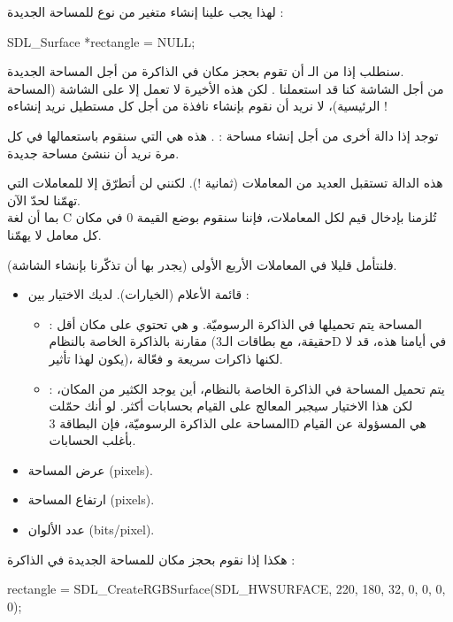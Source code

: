 لهذا يجب علينا إنشاء متغير من نوع
للمساحة الجديدة :

\begin{Csource}
SDL_Surface *rectangle = NULL;
\end{Csource}

سنطلب إذا من الـ
أن تقوم بحجز مكان في الذاكرة من أجل المساحة الجديدة.\\
من أجل الشاشة كنا قد استعملنا
.
لكن هذه الأخيرة لا تعمل إلا على  الشاشة (المساحة الرئيسية)، لا نريد أن نقوم بإنشاء نافذة من أجل كل مستطيل نريد إنشاءه !

توجد إذا دالة أخرى من أجل إنشاء مساحة : 
.
هذه هي التي سنقوم باستعمالها في كل مرة نريد أن ننشئ مساحة جديدة.

هذه الدالة تستقبل العديد من المعاملات (ثمانية !). لكنني لن أتطرّق إلا للمعاملات التي تهمّنا لحدّ الآن.\\
بما أن لغة 
\textenglish{C}
تُلزمنا بإدخال قيم لكل المعاملات، فإننا سنقوم بوضع القيمة 0 في مكان كل معامل لا يهمّنا.

فلنتأمل قليلا في المعاملات الأربع الأولى (يجدر بها أن تذكّرنا بإنشاء الشاشة).

\begin{itemize}
	\item قائمة الأعلام (الخيارات). لديك الاختيار بين :
	\begin{itemize}
		\item {} :
		المساحة يتم تحميلها في الذاكرة الرسوميّة. و هي تحتوي على مكان أقل مقارنة بالذاكرة الخاصة بالنظام (حقيقة، مع بطاقات الـ\textenglish{3D}
		في أيامنا هذه، قد لا يكون لهذا تأثير)، لكنها ذاكرات سريعة و فعّالة.
		\item {} :
		يتم تحميل المساحة في الذاكرة الخاصة بالنظام، أين يوجد الكثير من المكان، لكن هذا الاختيار سيجبر المعالج على القيام بحسابات أكثر. لو أنك حمّلت المساحة على الذاكرة الرسوميّة، فإن البطاقة 
		\textenglish{3D}
		هي المسؤولة عن القيام بأغلب الحسابات.
	\end{itemize}
	\item عرض المساحة (\textenglish{pixels}).
	\item ارتفاع المساحة (\textenglish{pixels}).
	\item عدد الألوان (\textenglish{bits/pixel}).
\end{itemize}

هكذا إذا نقوم بحجز مكان للمساحة الجديدة في الذاكرة :

\begin{Csource}
rectangle = SDL_CreateRGBSurface(SDL_HWSURFACE, 220, 180, 32, 0, 0, 0, 0);
\end{Csource}

